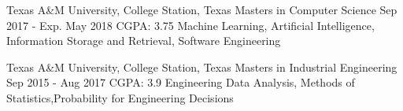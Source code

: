 

\begin{cventries}

  \cventry
    {Texas A\&M University, College Station, Texas} %
    {Masters in Computer Science} %
    {Sep 2017 - Exp. May 2018} %
    {CGPA: 3.75} %
    {Machine Learning, Artificial Intelligence, Information Storage and Retrieval, Software Engineering}
    

  \cventry
    {Texas A\&M University, College Station, Texas} %
    {Masters in Industrial Engineering} %
    {Sep 2015 - Aug 2017} %
    {CGPA: 3.9} %
    { Engineering Data Analysis, Methods of Statistics,Probability for Engineering Decisions}
\end{cventries}
